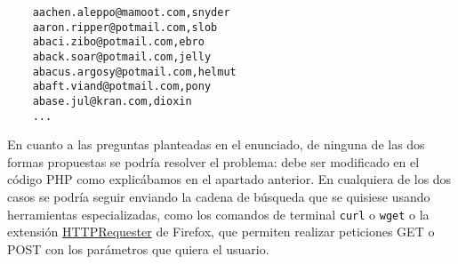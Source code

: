 \documentclass{article}
\begin{document}
\begin{Verbatim}
    aachen.aleppo@mamoot.com,snyder
    aaron.ripper@potmail.com,slob
    abaci.zibo@potmail.com,ebro
    aback.soar@potmail.com,jelly
    abacus.argosy@potmail.com,helmut
    abaft.viand@potmail.com,pony
    abase.jul@kran.com,dioxin
    ...
\end{Verbatim}

En cuanto a las preguntas planteadas en el enunciado, de ninguna de las dos formas propuestas se podría resolver el problema: debe ser modificado en el código PHP como explicábamos en el apartado anterior. En cualquiera de los dos casos se podría seguir enviando la cadena de búsqueda que se quisiese usando herramientas especializadas, como los comandos de terminal \texttt{curl} o \texttt{wget} o la extensión \href{https://addons.mozilla.org/En-us/firefox/addon/httprequester/}{HTTPRequester} de Firefox, que permiten realizar peticiones GET o POST con los parámetros que quiera el usuario.
\end{document}
